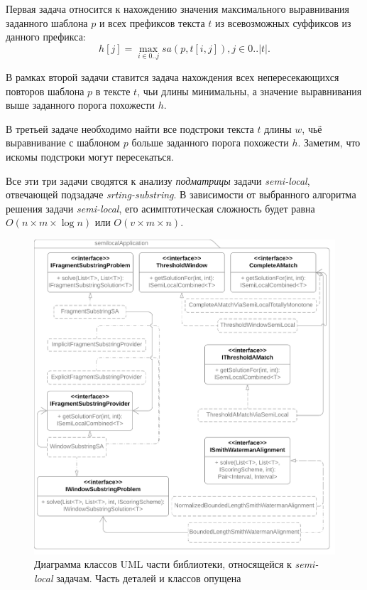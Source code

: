 Первая задача относится к нахождению значения максимального выравнивания заданного шаблона $p$ и всех префиксов текста $t$ из всевозможных суффиксов из данного префикса:
\begin{equation}
    h[j] = \max _{i \in 0 ..j} sa(p,t[i,j]), j \in 0..|t|.
\end{equation}

В рамках второй задачи ставится задача нахождения всех непересекающихся повторов шаблона $p$ в тексте $t$, чьи длины минимальны, а значение выравнивания выше заданного порога похожести $h$.

В третьей задаче необходимо найти все подстроки текста $t$ длины $w$, чьё выравнивание с шаблоном $p$ больше заданного порога похожести $h$. Заметим, что искомы подстроки могут пересекаться.

Все эти три задачи сводятся к анализу \emph{подматрицы} задачи \emph{semi-local}, отвечающей подзадаче \emph{srting-substring}.
В зависимости от выбранного алгоритма решения задачи \emph{semi-local}, его асимптотическая сложность будет равна $O(n \times m \times \log n)$ или $O(v \times  m \times n)$.

\begin{figure}
    \centering
    \includegraphics[width=1.35\columnwidth,angle=90]{Mishin/figures/semiLocalApplication.png}
    \caption{Диаграмма классов UML части библиотеки, относящейся к \emph{semi-local} задачам. Часть деталей и классов опущена}\label{fig:libraryApplication}
\end{figure}

